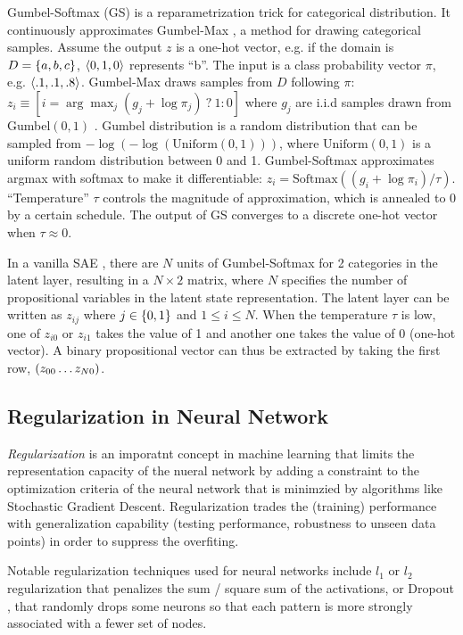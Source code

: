Gumbel-Softmax (GS) is a re\-para\-metri\-zation trick \cite{jang2016categorical} for categorical distribution.
It continuously approximates Gumbel-Max \cite{maddison2014sampling}, a method for drawing categorical samples.
Assume the output $z$ is a one-hot vector, e.g. if the domain is $D={\left\{a,b,c\right\}}$, ${\left<0,1,0\right>}$ represents ``b''.
The input is a class probability vector $\pi$, e.g. ${\left<.1,.1,.8\right>}$.
Gumbel-Max draws samples from $D$ following $\pi$:
 $z_i \equiv [ i = \arg \max_j (g_j+\log \pi_j)\ ?\ 1 : 0 ]$
where $g_j$ are i.i.d samples drawn from Gumbel$(0,1)$ \cite{gumbel1954statistical}.
Gumbel distribution is a random distribution that can be sampled from $-\log (-\log (\text{Uniform}(0,1)))$, where
$\text{Uniform}(0,1)$ is a uniform random distribution between 0 and 1.
Gumbel-Softmax approximates argmax with softmax to make it differentiable:
$z_i = \text{Softmax}((g_i+\log \pi_i)/\tau)$.
``Temperature'' $\tau$ controls the magnitude of approximation, which is annealed to 0 by a certain schedule.
The output of GS converges to a discrete one-hot vector when $\tau\approx 0$.

In a vanilla SAE \cite{Asai2018}, there are $N$ units of Gumbel-Softmax
for 2 categories in the latent layer, resulting in a $N\times 2$ matrix,
where $N$ specifies the number of propositional variables in the latent
state representation. The latent layer can be written as
$z_{ij}$ where $j\in {\left\{0,1\right\}}$ and $1\leq i \leq N$.  When the
temperature $\tau$ is low, one of $z_{i0}$ or $z_{i1}$ takes the value
of 1 and another one takes the value of 0 (one-hot vector).  A binary
propositional vector can thus be extracted by taking the first row,
${\left(z_{00}\ldots z_{N0}\right)}$.

\subsection{Regularization in Neural Network}

\emph{Regularization} is an imporatnt concept in machine learning
that limits the representation capacity of the nueral network by adding a constraint
to the optimization criteria of the neural network that is minimzied by algorithms like Stochastic Gradient Descent.
Regularization trades the (training) performance with generalization capability (testing performance, robustness to
unseen data points) in order to suppress the overfiting.

Notable regularization techniques used for neural networks include
$l_1$ or $l_2$ regularization that penalizes the sum / square sum of the
activations, or Dropout \cite{srivastava2014dropout}, that randomly drops some neurons so
that each pattern is more strongly associated with a fewer set of nodes.

